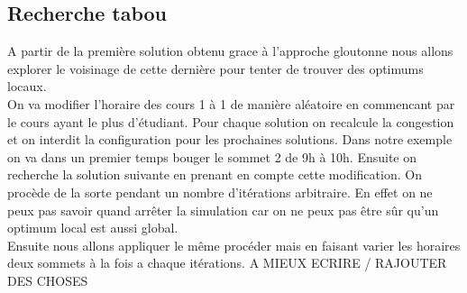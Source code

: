 \documentclass[a4paper,11pt]{article}
\begin{document}
 	\subsection{Recherche tabou}
 		A partir de la première solution obtenu grace à l'approche gloutonne nous allons explorer le voisinage de cette dernière pour tenter de trouver des optimums locaux.\\
 		On va modifier l'horaire des cours 1 à 1 de manière aléatoire en commencant par le cours ayant le plus d'étudiant. Pour chaque solution on recalcule la congestion et on interdit la configuration pour les prochaines solutions. Dans notre exemple on va dans un premier temps bouger le sommet 2 de 9h à 10h. Ensuite on recherche la solution suivante en prenant en compte cette modification. On procède de la sorte pendant un nombre d'itérations arbitraire. En effet on ne peux pas savoir quand arrêter la simulation car on ne peux pas être sûr qu'un optimum local est aussi global.\\
 		Ensuite nous allons appliquer le même procéder mais en faisant varier les horaires deux sommets à la fois a chaque itérations.
 		A MIEUX ECRIRE / RAJOUTER DES CHOSES
\end{document}
